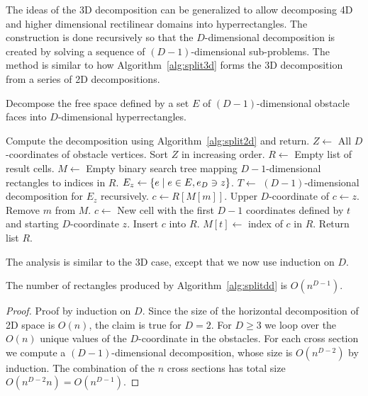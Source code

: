 \documentclass[english,gradu]{tktltiki2018}
\begin{document}
The ideas of the 3D decomposition can be generalized to allow decomposing 4D and higher dimensional rectilinear domains into hyperrectangles.
The construction is done recursively so that the $D$-dimensional decomposition is created by solving a sequence of $(D-1)$-dimensional sub-problems.
The method is similar to how Algorithm~\ref{alg:split3d} forms the 3D decomposition from a series of 2D decompositions.

\begin{alg}\label{alg:splitdd}
Decompose the free space defined by a set $E$ of $(D-1)$-dimensional obstacle faces into $D$-dimensional hyperrectangles.
\begin{algorithmic}
	\State Compute the decomposition using Algorithm~\ref{alg:split2d} and return.
\EndIf
\State $Z\gets$ All $D$-coordinates of obstacle vertices.
\State Sort $Z$ in increasing order.
\State $R\gets$ Empty list of result cells.
\State $M\gets$ Empty binary search tree mapping $D-1$-dimensional rectangles to indices in $R$.
	\State $E_z\gets\left\{e \mid e\in E, e_D\ni z\right\}$.
	\State $T\gets$ $(D-1)$-dimensional decomposition for $E_z$ recursively.
		\State $c\gets R[M[m]]$.
		\State Upper $D$-coordinate of $c\gets z$.
		\State Remove $m$ from $M$.
	\EndFor
		\State $c\gets$ New cell with the first $D-1$ coordinates defined by $t$ and starting $D$-coordinate $z$.
		\State Insert $c$ into $R$.
		\State $M[t]\gets$ index of $c$ in $R$.
	\EndFor
\EndFor
\State Return list $R$.
\end{algorithmic}
\end{alg}

The analysis is similar to the 3D case, except that we now use induction on $D$.

\begin{lem}\label{lem:splitddcells}The number of rectangles produced by Algorithm~\ref{alg:splitdd} is $O(n^{D-1})$.\end{lem}
\begin{proof}
Proof by induction on $D$.
Since the size of the horizontal decomposition of 2D space is $O(n)$, the claim is true for $D=2$.
For $D\ge 3$ we loop over the $O(n)$ unique values of the $D$-coordinate in the obstacles.
For each cross section we compute a $(D-1)$-dimensional decomposition, whose size is $O(n^{D-2})$ by induction.
The combination of the $n$ cross sections has total size $O(n^{D-2}n)=O(n^{D-1})$.
\end{proof}
\end{document}
